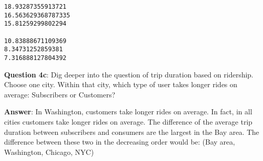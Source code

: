 \documentclass[11pt]{article}
\begin{document}
    \begin{Verbatim}[commandchars=\\\{\}]
18.93287355913721
16.563629368787335
15.81259299802294

10.83888671109369
8.34731252859381
7.316888127804392

    \end{Verbatim}

    \textbf{Question 4c}: Dig deeper into the question of trip duration
based on ridership. Choose one city. Within that city, which type of
user takes longer rides on average: Subscribers or Customers?

\textbf{Answer}: In Washington, customers take longer rides on average.
In fact, in all cities customers take longer rides on average. The
difference of the average trip duration between subscribers and
consumers are the largest in the Bay area. The difference between these
two in the decreasing order would be: (Bay area, Washington, Chicago,
NYC)
\end{document}

